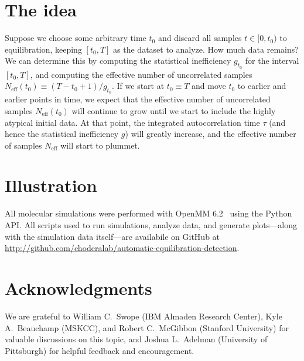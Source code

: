 \documentclass[aps,pre,twocolumn,nofootinbib,superscriptaddress,linenumbers,11point]{revtex4-1}
\begin{document}

\section*{The idea}
\label{section:the-idea}

Suppose we choose some arbitrary time $t_0$ and discard all samples $t \in [0, t_0)$ to equilibration, keeping $[t_0, T]$ as the dataset to analyze.
How much data remains?
We can determine this by computing the statistical inefficiency $g_{t_0}$ for the interval $[t_0, T]$, and computing the effective number of uncorrelated samples $N_\mathrm{eff}(t_0) \equiv (T - t_0 + 1) / g_{t_0}$.
If we start at $t_0 \equiv T$ and move $t_0$ to earlier and earlier points in time, we expect that the effective number of uncorrelated samples $N_\mathrm{eff}(t_0)$ will continue to grow until we start to include the highly atypical initial data.
At that point, the integrated autocorrelation time $\tau$ (and hence the statistical inefficiency $g$) will greatly increase, and the effective number of samples $N_\mathrm{eff}$ will start to plummet.



\section*{Illustration}
\label{section:methods}

All molecular simulations were performed with OpenMM 6.2~\cite{eastman:jctc:2012:openmm} using the Python API.
All scripts used to run simulations, analyze data, and generate plots---along with the simulation data itself---are availabile on GitHub at \url{http://github.com/choderalab/automatic-equilibration-detection}.


\section*{Acknowledgments}

We are grateful to William C.~Swope (IBM Almaden Research Center), Kyle A.~Beauchamp (MSKCC), and Robert C.~McGibbon (Stanford University) for valuable discussions on this topic, and Joshua L.~Adelman (University of Pittsburgh) for helpful feedback and encouragement.


 

\end{document}
